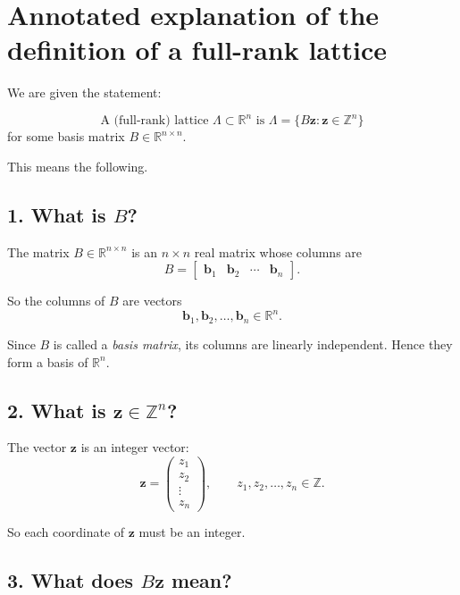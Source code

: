 \documentclass[12pt]{article}
\begin{document}
	
	\section*{Annotated explanation of the definition of a full-rank lattice}
	
	We are given the statement:
	
	\[
	\text{A (full-rank) lattice } \Lambda \subset \mathbb{R}^n \text{ is }
	\Lambda = \{B\mathbf{z} : \mathbf{z}\in\mathbb{Z}^n\}
	\]
	for some basis matrix \(B\in\mathbb{R}^{n\times n}\).
	
	\bigskip
	
	This means the following.
	
	\subsection*{1. What is \(B\)?}
	
	The matrix \(B\in\mathbb{R}^{n\times n}\) is an \(n\times n\) real matrix whose columns are
	\[
	B=
	\begin{bmatrix}
		\mathbf{b}_1 & \mathbf{b}_2 & \cdots & \mathbf{b}_n
	\end{bmatrix}.
	\]
	
	So the columns of \(B\) are vectors
	\[
	\mathbf{b}_1,\mathbf{b}_2,\dots,\mathbf{b}_n\in\mathbb{R}^n.
	\]
	
	Since \(B\) is called a \emph{basis matrix}, its columns are linearly independent. Hence they form a basis of \(\mathbb{R}^n\).
	
	\subsection*{2. What is \(\mathbf{z}\in\mathbb{Z}^n\)?}
	
	The vector \(\mathbf{z}\) is an integer vector:
	\[
	\mathbf{z}=
	\begin{pmatrix}
		z_1\\
		z_2\\
		\vdots\\
		z_n
	\end{pmatrix},
	\qquad z_1,z_2,\dots,z_n\in\mathbb{Z}.
	\]
	
	So each coordinate of \(\mathbf{z}\) must be an integer.
	
	\subsection*{3. What does \(B\mathbf{z}\) mean?}
	
\end{document}
